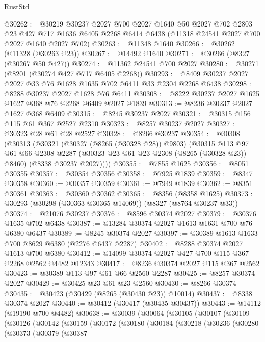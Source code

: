 \begin{lexlean}{RustStd}
\begin{coremodule}
@30262 := @30219
    @30237
    @2027
    @700
    @2027
    @1640
    @50
    @2027
    @702
    @2803
    @23
    @427
    @717
    @1636
    @6405
    @2268
    @6414
    @6438
    (@11318 @24541 @2027 @700 @2027 @1640 @2027 @702)
@30263 := @11348 @1640
@30266 := @30262 (@11328 (@30263 @23))
@30267 := @14492 @1640
@30271 := @30266 (@8327 (@30267 @50 @427))
@30274 := @11362 @24541 @700 @2027
@30280 := @30271 (@8201 (@30274 @427 @717 @6405 @2268))
@30293 := @8409 @30237 @2027 @2027 @33 @76 @1628 @1635 @702 @6411 @33 @2304 @2268 @6438
@30298 := @8288 @30237 @2027 @1628 @76 @6411
@30308 := @8222 @30237 @2027 @1625 @1627 @368 @76 @2268 @6409 @2027 @1839
@30313 := @8236 @30237 @2027 @1627 @368 @6409
@30315 := @8245 @30237 @2027
@30321 := @30315 @156 @115 @61 @367 @2527 @2310
@30323 := @8257 @30237 @2027
@30327 := @30323 @28 @61 @28 @2527
@30328 := @8266 @30237
@30354 := @30308
    (@30313
      (@30321
        (@30327 (@8265 (@30328 @28)) @9803)
        (@30315
          @113
          @97
          @61
          @66
          @2308
          @2287
          (@30323 @23 @61 @23 @2308 (@8265 (@30328 @23)) @8460)
          (@8338 @30237 @2027))))
@30355 := @7855 @1625
@30356 := @8051 @30355
@30357 := @30354 @30356
@30358 := @7925 @1839
@30359 := @8347 @30358
@30360 := @30357 @30359
@30361 := @7949 @1839
@30362 := @8351 @30361
@30363 := @30360 @30362
@30365 := @8356 (@8358 @1625)
@30373 := @30293 (@30298 (@30363 @30365 @14069)) (@8327 (@8764 @30237 @33))
@30374 := @21076 @30237
@30376 := @8596 @30374 @2027
@30379 := @30376 @1635 @702 @6438
@30387 := @13284 @30374 @2027 @1613 @1631 @700 @76 @6380 @6437
@30389 := @8245 @30374 @2027
@30397 := @30389 @1613 @1633 @700 @8629 @6380 (@2276 @6437 @2287)
@30402 := @8288 @30374 @2027 @1613 @700 @6380
@30412 := @14099 @30374 @2027 @427 @700 @115 @367 @2268 @2562 @4482 @12343
@30417 := @8236 @30374 @2027 @115 @367 @2562
@30423 := @30389 @113 @97 @61 @66 @2560 @2287
@30425 := @8257 @30374 @2027
@30429 := @30425 @23 @61 @23 @2560
@30430 := @8266 @30374
@30435 := @30423 (@30429 (@8265 (@30430 @23)) @10014)
@30437 := @8338 @30374 @2027
@30440 := @30412 (@30417 (@30435 @30437))
@30443 := @14112 (@19190 @700 @4482)
@30638 := @30039
    (@30064
      (@30105
        (@30107
          (@30109
            (@30126
              (@30142
                (@30159
                  (@30172
                    (@30180
                      (@30184
                        (@30218
                          (@30236
                            (@30280
                              (@30373
                                (@30379
                                  (@30387

\end{coremodule}
\end{lexlean}
